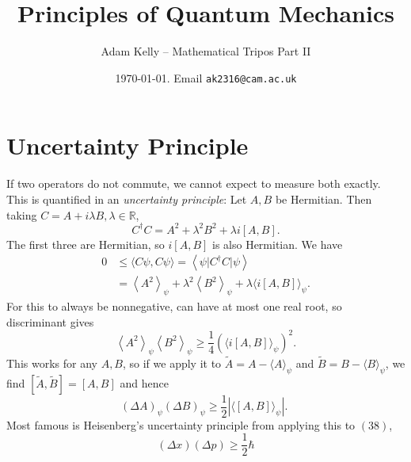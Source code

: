 \documentclass[a4paper, 10pt, twocolumn]{amsart}
\title{Principles of Quantum Mechanics}
\author{Adam Kelly -- Mathematical Tripos Part II}
\date{\today. Email \texttt{ak2316@cam.ac.uk}}
\begin{document}
\maketitle

\section{Uncertainty Principle}

If two operators do not commute, we cannot expect to measure both exactly. This is quantified in an \emph{uncertainty principle}: Let $A, B$ be Hermitian. Then taking $C=A+i \lambda B, \lambda \in \mathbb{R}$,
$$
C^{\dagger} C=A^2+\lambda^2 B^2+\lambda i[A, B] .
$$
The first three are Hermitian, so $i[A, B]$ is also Hermitian. We have
$$
\begin{aligned}
0 & \leqslant\langle C \psi, C \psi\rangle=\left\langle\psi\lvert C^{\dagger} C \lvert \psi\right\rangle \\
& =\left\langle A^2\right\rangle_\psi+\lambda^2\left\langle B^2\right\rangle_\psi+\lambda\langle i[A, B]\rangle_\psi .
\end{aligned}
$$
For this to always be nonnegative, can have at most one real root, so discriminant gives
$$
\left\langle A^2\right\rangle_\psi\left\langle B^2\right\rangle_\psi \geqslant \frac{1}{4}\left(\langle i[A, B]\rangle_\psi\right)^2 .
$$
This works for any $A, B$, so if we apply it to $\tilde{A}=A-\langle A\rangle_\psi$ and $\tilde{B}=B-\langle B\rangle_\psi$, we find $[\tilde{A}, \tilde{B}]=[A, B]$ and hence
$$
(\Delta A)_\psi(\Delta B)_\psi \geqslant \frac{1}{2}\left|\langle[A, B]\rangle_\psi\right| \text {. }
$$
Most famous is Heisenberg's uncertainty principle from applying this to $(38)$,
$$
(\Delta x)(\Delta p) \geqslant \frac{1}{2} \hbar
$$
\end{document}
